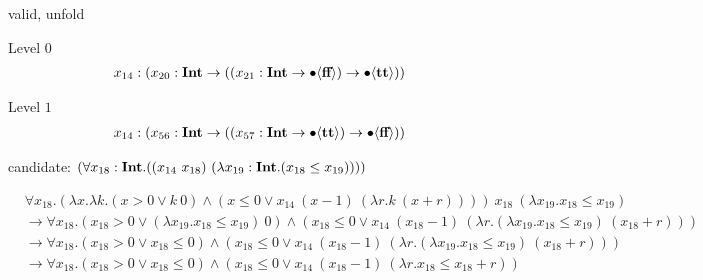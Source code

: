 \documentclass{article}
\begin{document}
valid, unfold

Level \( 0 \)
\begin{align*}
x_{ 14 } &: ({ x_{ 20 } } : \textbf{Int} \to (({ x_{ 21 } } : \textbf{Int} \to \bullet \langle  \textbf{ff}  \rangle)\to \bullet \langle  \textbf{tt}  \rangle))\\
\end{align*}

Level \( 1 \)
\begin{align*}
x_{ 14 } &: ({ x_{ 56 } } : \textbf{Int} \to (({ x_{ 57 } } : \textbf{Int} \to \bullet \langle  \textbf{tt}  \rangle)\to \bullet \langle  \textbf{ff}  \rangle))\\
\end{align*}

candidate: \( (\forall x_{ 18 }: \textbf{Int} . ((x_{ 14 }\  x_{ 18 } )\ (\lambda x_{ 19 }: \textbf{Int} . ( x_{ 18 }  \leq  x_{ 19 } )))) \)



\begin{align*}
    &\forall x_{18}. (\lambda x. \lambda k. (x > 0 \vee k\ 0) \wedge (x \leq 0 \vee
    x_{14}\ (x - 1)\  (\lambda r. k\ (x + r))))
    \ x_{18}
    \ (\lambda x_{19}. x_{18} \leq x_{19}) \\
    & \longrightarrow
    \forall x_{18}. (x_{18} > 0 \vee (\lambda x_{19}. x_{18}\leq x_{19})\ 0)
    \wedge (x_{18} \leq 0 \vee
    x_{14}\ (x_{18} - 1)\  (\lambda r. (\lambda x_{19}.x_{18} \leq x_{19}) \
    (x_{18} + r))) \\
    & \longrightarrow
    \forall x_{18}. (x_{18} > 0 \vee x_{18}\leq 0)
    \wedge (x_{18} \leq 0 \vee
    x_{14}\ (x_{18} - 1)\  (\lambda r. (\lambda x_{19}.x_{18} \leq x_{19}) \
    (x_{18} + r))) \\
    & \longrightarrow
    \forall x_{18}. (x_{18} > 0 \vee x_{18}\leq 0)
    \wedge (x_{18} \leq 0 \vee
    x_{14}\ (x_{18} - 1)\  (\lambda r. x_{18} \leq x_{18} + r))
\end{align*}
\end{document}

